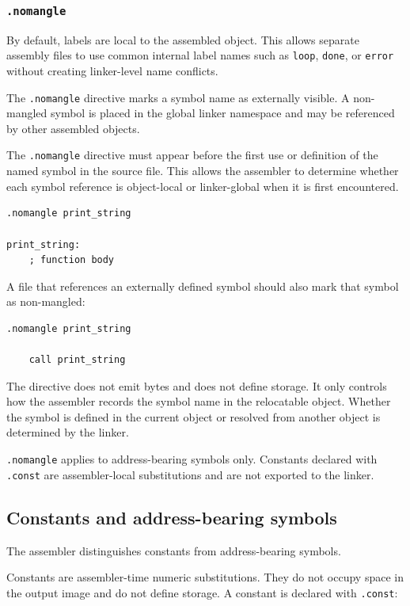 \subsubsection{\texttt{.nomangle}}

By default, labels are local to the assembled object. This allows separate assembly
files to use common internal label names such as \texttt{loop}, \texttt{done}, or
\texttt{error} without creating linker-level name conflicts.

The \texttt{.nomangle} directive marks a symbol name as externally visible. A
non-mangled symbol is placed in the global linker namespace and may be referenced by
other assembled objects.

The \texttt{.nomangle} directive must appear before the first use or definition of the
named symbol in the source file. This allows the assembler to determine whether each
symbol reference is object-local or linker-global when it is first encountered.

\begin{verbatim}
.nomangle print_string

print_string:
    ; function body
\end{verbatim}

A file that references an externally defined symbol should also mark that symbol as
non-mangled:

\begin{verbatim}
.nomangle print_string

    call print_string
\end{verbatim}

The directive does not emit bytes and does not define storage. It only controls how the
assembler records the symbol name in the relocatable object. Whether the symbol is
defined in the current object or resolved from another object is determined by the
linker.

\texttt{.nomangle} applies to address-bearing symbols only. Constants declared with
\texttt{.const} are assembler-local substitutions and are not exported to the linker.

\subsection{Constants and address-bearing symbols}

The assembler distinguishes constants from address-bearing symbols.

Constants are assembler-time numeric substitutions. They do not occupy space in the
output image and do not define storage. A constant is declared with \texttt{.const}:


